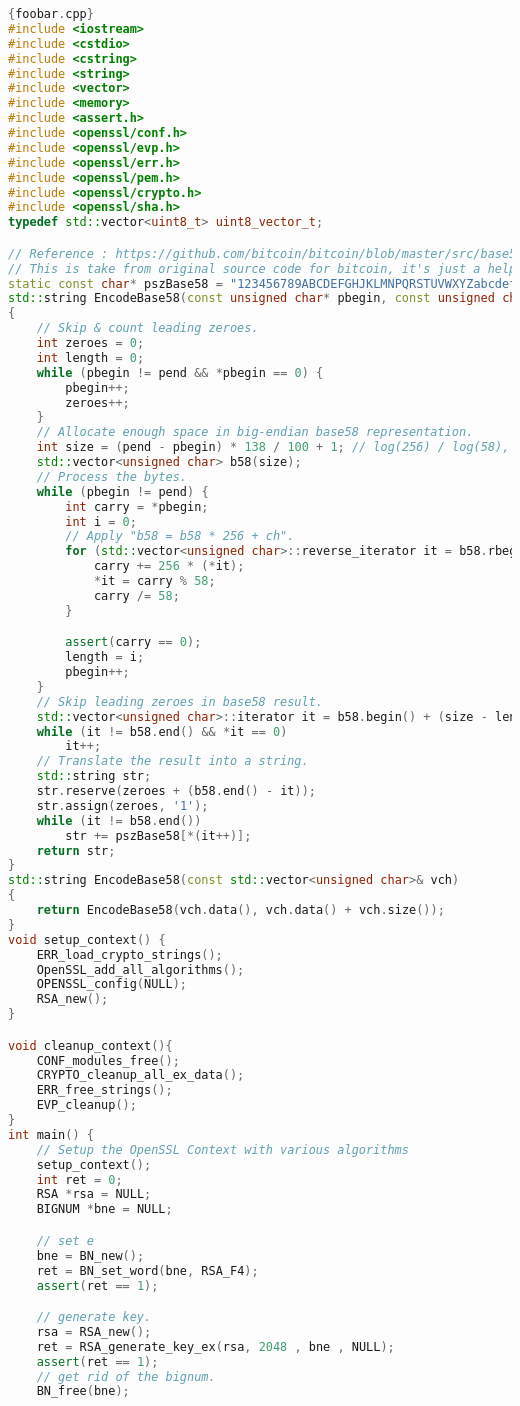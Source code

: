 \begin{lstlisting}[language=c++]{foobar.cpp}
#include <iostream>
#include <cstdio>
#include <cstring>
#include <string>
#include <vector>
#include <memory>
#include <assert.h>
#include <openssl/conf.h>
#include <openssl/evp.h>
#include <openssl/err.h>
#include <openssl/pem.h>
#include <openssl/crypto.h>
#include <openssl/sha.h>
typedef std::vector<uint8_t> uint8_vector_t;

// Reference : https://github.com/bitcoin/bitcoin/blob/master/src/base58.cpp
// This is take from original source code for bitcoin, it's just a helper function
static const char* pszBase58 = "123456789ABCDEFGHJKLMNPQRSTUVWXYZabcdefghijkmnopqrstuvwxyz";
std::string EncodeBase58(const unsigned char* pbegin, const unsigned char* pend)
{
	// Skip & count leading zeroes.
	int zeroes = 0;
	int length = 0;
	while (pbegin != pend && *pbegin == 0) {
		pbegin++;
		zeroes++;
	}
	// Allocate enough space in big-endian base58 representation.
	int size = (pend - pbegin) * 138 / 100 + 1; // log(256) / log(58), rounded up.
	std::vector<unsigned char> b58(size);
	// Process the bytes.
	while (pbegin != pend) {
		int carry = *pbegin;
		int i = 0;
		// Apply "b58 = b58 * 256 + ch".
		for (std::vector<unsigned char>::reverse_iterator it = b58.rbegin(); (carry != 0 || i < length) && (it != b58.rend()); it++, i++) {
			carry += 256 * (*it);
			*it = carry % 58;
			carry /= 58;
		}

		assert(carry == 0);
		length = i;
		pbegin++;
	}
	// Skip leading zeroes in base58 result.
	std::vector<unsigned char>::iterator it = b58.begin() + (size - length);
	while (it != b58.end() && *it == 0)
		it++;
	// Translate the result into a string.
	std::string str;
	str.reserve(zeroes + (b58.end() - it));
	str.assign(zeroes, '1');
	while (it != b58.end())
		str += pszBase58[*(it++)];
	return str;
}
std::string EncodeBase58(const std::vector<unsigned char>& vch)
{
	return EncodeBase58(vch.data(), vch.data() + vch.size());
}
void setup_context() {
	ERR_load_crypto_strings();
	OpenSSL_add_all_algorithms();
	OPENSSL_config(NULL);
	RSA_new();
}

void cleanup_context(){
	CONF_modules_free();
	CRYPTO_cleanup_all_ex_data();
	ERR_free_strings();
	EVP_cleanup();
}
int main() {
	// Setup the OpenSSL Context with various algorithms
	setup_context();
	int ret = 0;
	RSA *rsa = NULL;
	BIGNUM *bne = NULL;

	// set e
	bne = BN_new();
	ret = BN_set_word(bne, RSA_F4);
	assert(ret == 1);

	// generate key.
	rsa = RSA_new();
	ret = RSA_generate_key_ex(rsa, 2048 , bne , NULL);
	assert(ret == 1);
	// get rid of the bignum.
	BN_free(bne);


\end{lstlisting}
